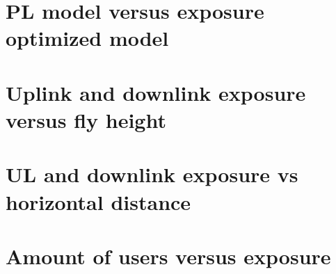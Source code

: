 \section{PL model versus exposure optimized model}
\label{sec:modelcomparison}


\section{Uplink and downlink exposure versus fly height}
\label{sec:expvsflyheight}

\section{UL and downlink exposure vs horizontal distance}
\label{sec:sarvsexp}

\section{Amount of users versus exposure}
\label{sec:dlexpvspc}

